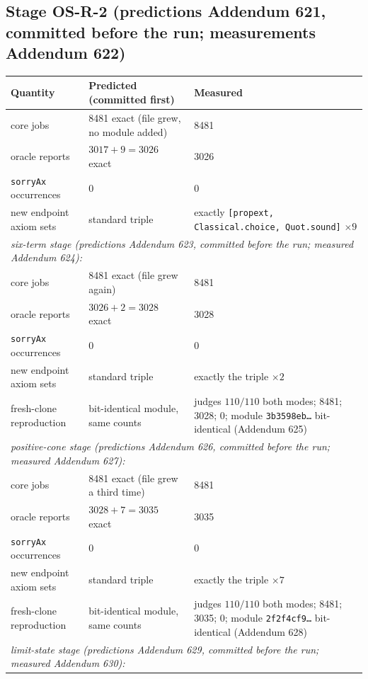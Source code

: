 \documentclass[11pt]{article}
\newcommand{\lean}[1]{\texttt{#1}}
\begin{document}
\subsection*{Stage OS-R-2 (predictions Addendum 621, committed before
the run; measurements Addendum 622)}
\begin{center}
\begin{tabular}{lll}
\textbf{Quantity} & \textbf{Predicted (committed first)} &
\textbf{Measured} \\ \hline
core jobs & 8481 exact (file grew, no module added) & 8481 \\
oracle reports & $3017+9 = 3026$ exact & 3026 \\
\lean{sorryAx} occurrences & 0 & 0 \\
new endpoint axiom sets & standard triple & exactly
\lean{[propext, Classical.choice, Quot.sound]} $\times 9$ \\
\hline
\multicolumn{3}{l}{\emph{six-term stage (predictions Addendum 623,
committed before the run; measured Addendum 624):}} \\
core jobs & 8481 exact (file grew again) & 8481 \\
oracle reports & $3026+2 = 3028$ exact & 3028 \\
\lean{sorryAx} occurrences & 0 & 0 \\
new endpoint axiom sets & standard triple & exactly the triple
$\times 2$ \\
fresh-clone reproduction & bit-identical module, same counts &
judges $110/110$ both modes; 8481; 3028; 0; module
\lean{3b3598eb\ldots} bit-identical (Addendum 625) \\
\hline
\multicolumn{3}{l}{\emph{positive-cone stage (predictions Addendum 626,
committed before the run; measured Addendum 627):}} \\
core jobs & 8481 exact (file grew a third time) & 8481 \\
oracle reports & $3028+7 = 3035$ exact & 3035 \\
\lean{sorryAx} occurrences & 0 & 0 \\
new endpoint axiom sets & standard triple & exactly the triple
$\times 7$ \\
fresh-clone reproduction & bit-identical module, same counts &
judges $110/110$ both modes; 8481; 3035; 0; module
\lean{2f2f4cf9\ldots} bit-identical (Addendum 628) \\
\hline
\multicolumn{3}{l}{\emph{limit-state stage (predictions Addendum 629,
committed before the run; measured Addendum 630):}} \\

\end{tabular}
\end{center}
\end{document}
